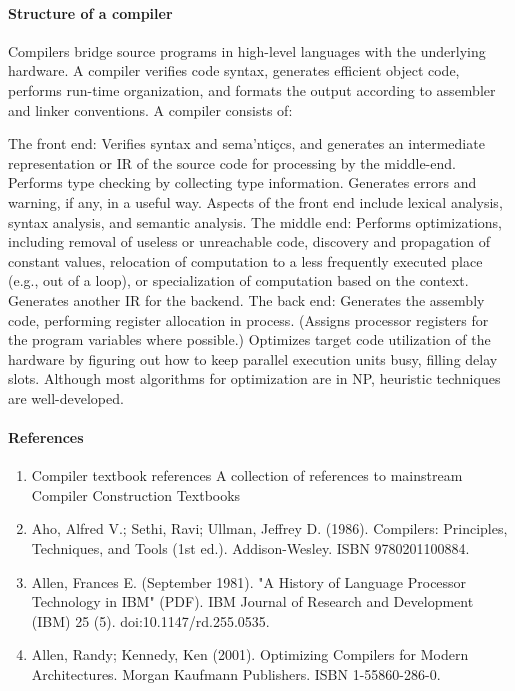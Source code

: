 \documentclass{article}
\begin{document}
\paragraph{Structure of a compiler}

Compilers bridge source programs in high-level languages with the underlying hardware. A compiler verifies code syntax, generates efficient object code, performs run-time organization, and formats the output according to assembler and linker conventions. A compiler consists of:

    The front end: Verifies syntax and sema'ntiçcs, and generates an intermediate representation or IR of the source code for processing by the middle-end. Performs type checking by collecting type information. Generates errors and warning, if any, in a useful way. Aspects of the front end include lexical analysis, syntax analysis, and semantic analysis.
    The middle end: Performs optimizations, including removal of useless or unreachable code, discovery and propagation of constant values, relocation of computation to a less frequently executed place (e.g., out of a loop), or specialization of computation based on the context. Generates another IR for the backend.
    The back end: Generates the assembly code, performing register allocation in process. (Assigns processor registers for the program variables where possible.) Optimizes target code utilization of the hardware by figuring out how to keep parallel execution units busy, filling delay slots. Although most algorithms for optimization are in NP, heuristic techniques are well-developed.
    
\paragraph{References}

\begin{enumerate}

\item Compiler textbook references A collection of references to mainstream Compiler Construction Textbooks

\item Aho, Alfred V.; Sethi, Ravi; Ullman, Jeffrey D. (1986). Compilers: Principles, Techniques, and Tools (1st ed.). Addison-Wesley. ISBN 9780201100884.
\item Allen, Frances E. (September 1981). "A History of Language Processor Technology in IBM" (PDF). IBM Journal of Research and Development (IBM) 25 (5). doi:10.1147/rd.255.0535.
\item Allen, Randy; Kennedy, Ken (2001). Optimizing Compilers for Modern Architectures. Morgan Kaufmann Publishers. ISBN 1-55860-286-0.

\end{enumerate}
\end{document}
